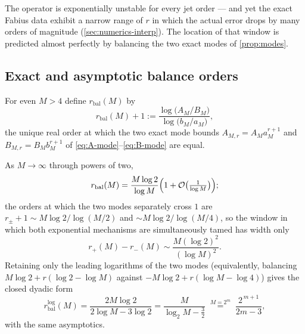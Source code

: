 \documentclass[11pt,oneside]{article}
\numberwithin{equation}{section}
\theoremstyle{definition}
\theoremstyle{remark}
\newcommand{\bigO}{\mathcal O}
\begin{document}
The operator is exponentially unstable for every jet order --- and yet
the exact Fabius data exhibit a narrow range of $r$ in which the
actual error drops by many orders of magnitude
(\cref{sec:numerics-interp}).  The location of that window is
predicted almost perfectly by balancing the two exact modes of
\cref{prop:modes}.

\subsection{Exact and asymptotic balance orders}

\begin{definition}
\label{def:balance}
For even $M>4$ define $r_{\mathrm{bal}}(M)$ by
\begin{equation}
 r_{\mathrm{bal}}(M)+1
 :=\frac{\log\bigl(A_M/B_M\bigr)}{\log\bigl(b_M/a_M\bigr)},
 \label{eq:balance-exact}
\end{equation}
the unique real order at which the two exact mode bounds
$A_{M,r}=A_Ma_M^{r+1}$ and $B_{M,r}=B_Mb_M^{r+1}$ of
\eqref{eq:A-mode}--\eqref{eq:B-mode} are equal.
\end{definition}

\begin{proposition}
\label{prop:balance-asymptotic}
As $M\to\infty$ through powers of two,
\begin{equation}
 r_{\mathrm{bal}}(M)
 =\frac{M\log2}{\log M}
 \Bigl(1+\bigO\bigl(\tfrac1{\log M}\bigr)\Bigr);
 \label{eq:balance-asymptotic}
\end{equation}
the orders at which the two modes separately cross $1$ are
$r_\pm+1\sim M\log2/\log(M/2)$ and $\sim M\log2/\log(M/4)$, so the
window in which both exponential mechanisms are simultaneously tamed
has width only
\begin{equation}
 r_+(M)-r_-(M)\sim\frac{M(\log2)^{2}}{(\log M)^{2}}.
 \label{eq:window-width}
\end{equation}
Retaining only the leading logarithms of the two modes
(equivalently, balancing $M\log2+r(\log2-\log M)$ against
$-M\log2+r(\log M-\log4)$) gives the closed dyadic form
\begin{equation}
 r_{\mathrm{bal}}^{\log}(M)
 =\frac{2M\log2}{2\log M-3\log2}
 =\frac{M}{\log_2M-\tfrac32}
 \;\overset{M=2^{m}}{=}\;
 \frac{2^{\,m+1}}{2m-3},
 \label{eq:balance-log}
\end{equation}
with the same asymptotics.
\end{proposition}
\end{document}
